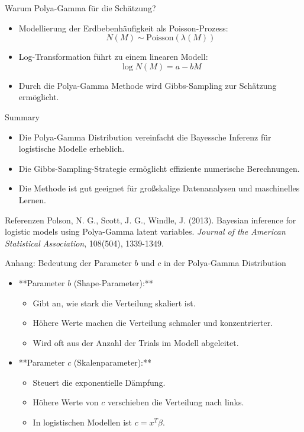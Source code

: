 \documentclass{beamer}
\begin{document}
	
	\begin{frame}{Warum Polya-Gamma für die Schätzung?}
		\begin{itemize}
			\item Modellierung der Erdbebenhäufigkeit als Poisson-Prozess:
			\[ N(M) \sim \text{Poisson}(\lambda(M)) \]
			\item Log-Transformation führt zu einem linearen Modell:
			\[ \log N(M) = a - bM \]
			\item Durch die Polya-Gamma Methode wird Gibbs-Sampling zur Schätzung ermöglicht.
		\end{itemize}
	\end{frame}
	
	
	
	
	\begin{frame}{Summary}
		\begin{itemize}
			\item Die Polya-Gamma Distribution vereinfacht die Bayessche Inferenz für logistische Modelle erheblich.
			\item Die Gibbs-Sampling-Strategie ermöglicht effiziente numerische Berechnungen.
			\item Die Methode ist gut geeignet für großskalige Datenanalysen und maschinelles Lernen.
		\end{itemize}
	\end{frame}
	




	\begin{frame}{Referenzen}
		Polson, N. G., Scott, J. G.,  Windle, J. (2013). Bayesian inference for logistic models using Polya-Gamma latent variables. \textit{Journal of the American Statistical Association}, 108(504), 1339-1349.
	\end{frame}


\begin{frame}{Anhang: Bedeutung der Parameter $b$ und $c$ in der Polya-Gamma Distribution}
	\begin{itemize}
		\item **Parameter $b$ (Shape-Parameter):**
		\begin{itemize}
			\item Gibt an, wie stark die Verteilung skaliert ist.
			\item Höhere Werte machen die Verteilung schmaler und konzentrierter.
			\item Wird oft aus der Anzahl der Trials im Modell abgeleitet.
		\end{itemize}
		\item **Parameter $c$ (Skalenparameter):**
		\begin{itemize}
			\item Steuert die exponentielle Dämpfung.
			\item Höhere Werte von $c$ verschieben die Verteilung nach links.
			\item In logistischen Modellen ist $c = x^T \beta$.
		\end{itemize}
	\end{itemize}
\end{frame}
\end{document}
